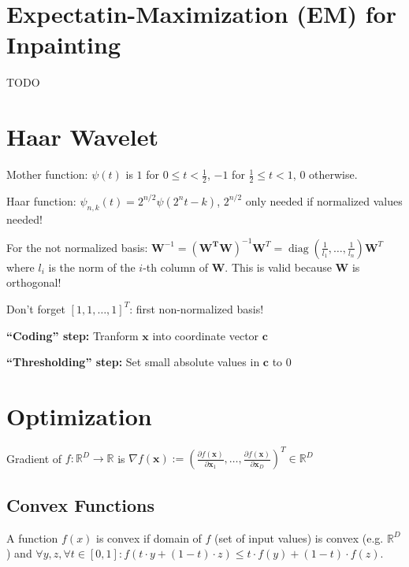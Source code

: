 \documentclass[a4paper, 11pt, landscape]{article}
\begin{document}
\begin{multicols*}{3}
\section{Expectatin-Maximization (EM) for Inpainting}
TODO

\section{Haar Wavelet}
\begin{compactdesc}
	\item[Mother function:] $\psi(t)$ is $1$ for $0 \leq t < \frac{1}{2}$, $-1$ for $\frac{1}{2} \leq t < 1$, $0$ otherwise.
	\item[Haar function:] $\psi_{n,k}(t) = 2^{n/2} \psi(2^n t - k)$, $2^{n/2}$ only needed if normalized values needed!
\end{compactdesc}

\begin{compactitem}
	\item For the not normalized basis: $\mathbf{W}^{-1} = (\mathbf{W^T} \mathbf{W})^{-1} \mathbf{W}^T = \operatorname{diag}(\frac{1}{l_1}, \ldots, \frac{1}{l_n}) \mathbf{W}^T$ where $l_i$ is the norm of the $i$-th column of $\mathbf{W}$. This is valid because $\mathbf{W}$ is orthogonal!
	\item Don't forget $[1, 1, \ldots, 1]^T$: first non-normalized basis!
	\item \textbf{``Coding'' step:} Tranform $\mathbf{x}$ into coordinate vector $\mathbf{c}$
	\item \textbf{``Thresholding'' step:} Set small absolute values in $\mathbf{c}$ to $0$
\end{compactitem}

\section{Optimization}
Gradient of $f: \mathbb{R}^D \to \mathbb{R}$ is $\nabla f(\mathbf{x}) := \left( \frac{\partial f(\mathbf{x})}{\partial \mathbf{x}_1}, \ldots, \frac{\partial f(\mathbf{x})}{\partial \mathbf{x}_D} \right)^T \in \mathbb{R}^D$

\subsection{Convex Functions}
A function $f(x)$ is convex if domain of $f$ (set of input values) is convex (e.g. $\mathbb{R}^D$) and $\forall y, z, \forall t \in [0, 1]: f(t \cdot y + (1-t) \cdot z) \leq t \cdot f(y) + (1-t) \cdot f(z)$.


\end{multicols*}
\end{document}
